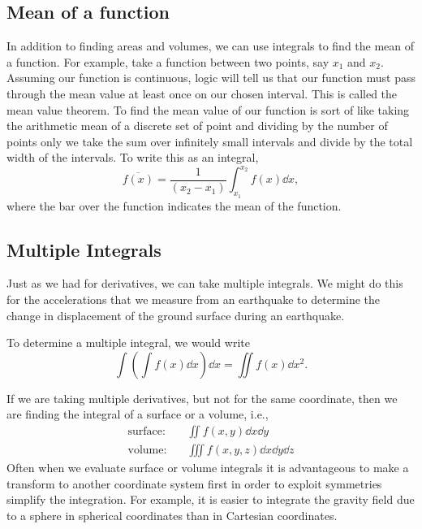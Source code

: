\documentclass[final,a4paper,12pt]{article}
\theoremstyle{definition}
\begin{document}
\subsection{Mean of a function}
In addition to finding areas and volumes, we can use integrals to find the mean
of a function.  For example, take a function between two points, say $x_1$ and
$x_2$.  Assuming our function is continuous, logic will tell us that our
function must pass through the mean value at least once on our chosen interval.
This is called the mean value theorem.  To find the mean value of our function
is sort of like taking the arithmetic mean of a discrete set of point and
dividing by the number of points only we take the sum over infinitely small
intervals and divide by the total width of the intervals.  To write this as an
integral,
\begin{equation}
    \overline{f(x)} = \frac{1}{(x_2 - x_1)}\int_{x_1}^{x_2} f(x) \dd{x} ,
\end{equation}
where the bar over the function indicates the mean of the function.

\subsection{Multiple Integrals}
Just as we had for derivatives, we can take multiple integrals.  We might do
this for the accelerations that we measure from an earthquake to determine the
change in displacement of the ground surface during an earthquake.

To determine a multiple integral, we would write
\begin{equation*}
    \int \left(\int f(x) \dd{x}\right) \dd{x} = \iint f(x) \dd{x^2} .
\end{equation*}

If we are taking multiple derivatives, but not for the same coordinate, then we
are finding the integral of a surface or a volume, i.e.,
\begin{align*}
    \text{surface:} \quad & \iint f(x,y) \dd{x} \dd{y} \\
    \text{volume:} \quad & \iiint f(x,y,z) \dd{x} \dd{y} \dd{z}
\end{align*}
Often when we evaluate surface or volume integrals it is advantageous to make a
transform to another coordinate system first in order to exploit symmetries
simplify the integration.  For example, it is easier to integrate the gravity
field due to a sphere in spherical coordinates than in Cartesian coordinates.
\end{document}
